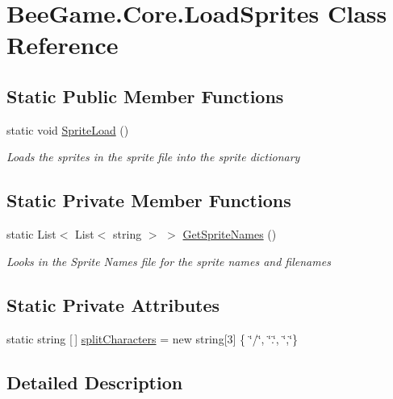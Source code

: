 \hypertarget{class_bee_game_1_1_core_1_1_load_sprites}{}\section{Bee\+Game.\+Core.\+Load\+Sprites Class Reference}
\label{class_bee_game_1_1_core_1_1_load_sprites}
\subsection*{Static Public Member Functions}
\begin{DoxyCompactItemize}
\item 
static void \hyperlink{class_bee_game_1_1_core_1_1_load_sprites_a501313d9f5961420d4a9a0ede72f6907}{Sprite\+Load} ()
\begin{DoxyCompactList}\small\item\em Loads the sprites in the sprite file into the sprite dictionary \end{DoxyCompactList}\end{DoxyCompactItemize}
\subsection*{Static Private Member Functions}
\begin{DoxyCompactItemize}
\item 
static List$<$ List$<$ string $>$ $>$ \hyperlink{class_bee_game_1_1_core_1_1_load_sprites_a3dca64c0b272b40389047ae9722bfcd3}{Get\+Sprite\+Names} ()
\begin{DoxyCompactList}\small\item\em Looks in the Sprite Names file for the sprite names and filenames \end{DoxyCompactList}\end{DoxyCompactItemize}
\subsection*{Static Private Attributes}
\begin{DoxyCompactItemize}
\item 
static string \mbox{[}$\,$\mbox{]} \hyperlink{class_bee_game_1_1_core_1_1_load_sprites_aaef6cb35c513009a03c13d1307d5bcba}{split\+Characters} = new string\mbox{[}3\mbox{]} \{ \char`\"{}/\char`\"{}, \char`\"{}.\char`\"{}, \char`\"{},\char`\"{}\}
\end{DoxyCompactItemize}


\subsection{Detailed Description}


